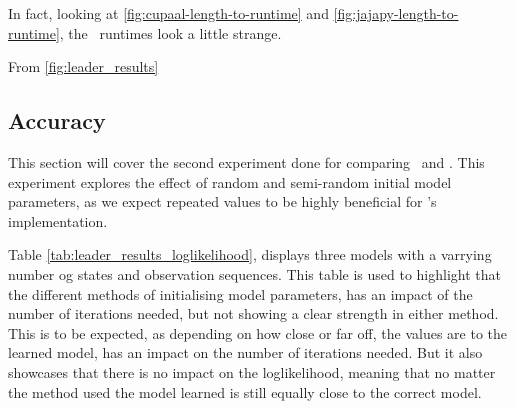 In fact, looking at \autoref{fig:cupaal-length-to-runtime} and \autoref{fig:jajapy-length-to-runtime}, the \Cupaal\ runtimes look a little strange.






From \autoref{fig:leader_results}




\subsection{Accuracy}\label{subsec:accuracy}
This section will cover the second experiment done for comparing \Cupaal\ and \Jajapy.
This experiment explores the effect of random and semi-random initial model parameters, as we expect repeated values to be highly beneficial for \Cupaal's implementation.

Table \autoref{tab:leader_results_loglikelihood}, displays three models with a varrying number og states and observation sequences.
This table is used to highlight that the different methods of initialising model parameters, has an impact of the number of iterations needed, but not showing a clear strength in either method.
This is to be expected, as depending on how close or far off, the values are to the learned model, has an impact on the number of iterations needed.
But it also showcases that there is no impact on the loglikelihood, meaning that no matter the method used the model learned is still equally close to the correct model.


